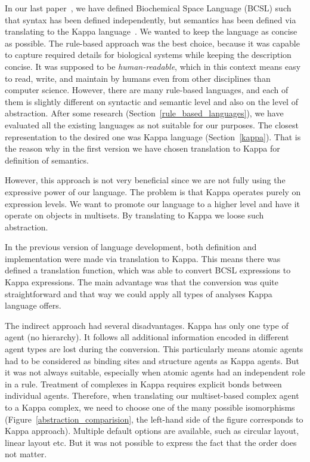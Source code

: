 \documentclass[12pt, twoside]{fithesis2} %
\begin{document}
In our last paper~\cite{Ded201627}, we have defined Biochemical Space Language (BCSL) such that syntax has been defined independently, but semantics has been defined via translating to the Kappa language~\cite{kappa_formal}. We wanted to keep the language as concise as possible. The rule-based approach was the best choice, because it was capable to capture required details for biological systems while keeping the description concise. It was supposed to be \emph{human-readable}, which in this context means easy to read, write, and maintain by humans even from other disciplines than computer science. However, there are many rule-based languages, and each of them is slightly different on syntactic and semantic level and also on the level of abstraction. After some research (Section~\ref{rule_based_languages}), we have evaluated all the existing languages as not suitable for our purposes. The closest representation to the desired one was Kappa language (Section~\ref{kappa}). That is the reason why in the first version we have chosen translation to Kappa for definition of semantics.

However, this approach is not very beneficial since we are not fully using the expressive power of our language. The problem is that Kappa operates purely on expression levels. We want to promote our language to a higher level and have it operate on objects in multisets. By translating to Kappa we loose such abstraction. 

In the previous version of language development, both definition and implementation were made via translation to Kappa. This means there was defined a translation function, which was able to convert BCSL expressions to Kappa expressions. The main advantage was that the conversion was quite straightforward and that way we could apply all types of analyses Kappa language offers.

The indirect approach had several disadvantages. Kappa has only one type of agent (no hierarchy). It follows all additional information encoded in different agent types are lost during the conversion. This particularly means atomic agents had to be considered as binding sites and structure agents as Kappa agents. But it was not always suitable, especially when atomic agents had an independent role in a rule. Treatment of complexes in Kappa requires explicit bonds between individual agents. Therefore, when translating our multiset-based complex agent to a Kappa complex, we need to choose one of the many possible isomorphisms (Figure~\ref{abstraction_comparision}, the left-hand side of the figure corresponds to Kappa approach). Multiple default options are available, such as circular layout, linear layout etc. But it was not possible to express the fact that the order does not matter.
\end{document}
